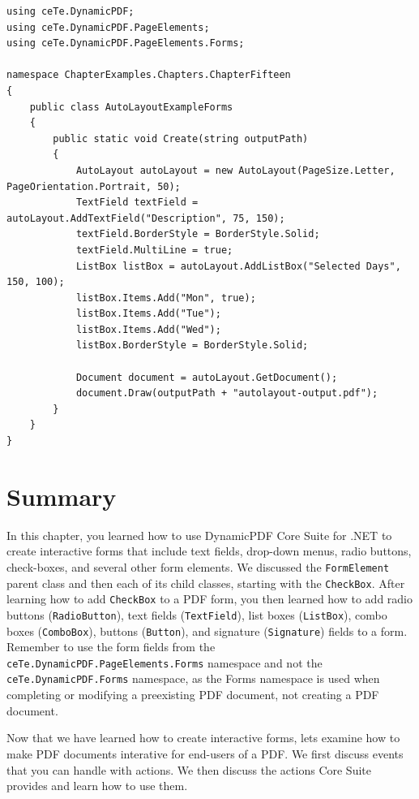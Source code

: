 \documentclass[american,letterpaper]{tufte-book}
\numberwithin{equation}{section}
\numberwithin{figure}{section}
\begin{document}
{\begin{lstlisting}[caption={Using AutoLayout to create a PDF document.},label={lis:autolayout-forms},basicstyle={\small\ttfamily},breaklines=true]
using ceTe.DynamicPDF;
using ceTe.DynamicPDF.PageElements;
using ceTe.DynamicPDF.PageElements.Forms;

namespace ChapterExamples.Chapters.ChapterFifteen
{
    public class AutoLayoutExampleForms
    {
        public static void Create(string outputPath)
        {
            AutoLayout autoLayout = new AutoLayout(PageSize.Letter, PageOrientation.Portrait, 50);
            TextField textField = autoLayout.AddTextField("Description", 75, 150);
            textField.BorderStyle = BorderStyle.Solid;
            textField.MultiLine = true;
            ListBox listBox = autoLayout.AddListBox("Selected Days", 150, 100);
            listBox.Items.Add("Mon", true);
            listBox.Items.Add("Tue");
            listBox.Items.Add("Wed");
            listBox.BorderStyle = BorderStyle.Solid;

            Document document = autoLayout.GetDocument();
            document.Draw(outputPath + "autolayout-output.pdf");
        }
    }
}

\end{lstlisting}
\leavevmode\egroup

\section{Summary}

In this chapter, you learned how to use DynamicPDF Core Suite
for .NET to create interactive forms that include text fields, drop-down
menus, radio buttons, check-boxes, and several other form elements.
We discussed the \texttt{FormElement} parent class and then each of
its child classes, starting with the \texttt{CheckBox}. After learning
how to add \texttt{CheckBox} to a PDF form, you then learned how to
add radio buttons (\texttt{RadioButton}), text fields (\texttt{TextField}),
list boxes (\texttt{ListBox}), combo boxes (\texttt{ComboBox}), buttons
(\texttt{Button}), and signature (\texttt{Signature}) fields to a
form. Remember to use the form fields from the \texttt{ceTe.DynamicPDF.PageElements.Forms}
namespace and not the \texttt{ceTe.DynamicPDF.Forms} namespace, as
the Forms namespace is used when completing or modifying a preexisting
PDF document, not creating a PDF document.

Now that we have learned how to create interactive forms, lets examine
how to make PDF documents interative for end-users of a PDF. We first
discuss events that you can handle with actions. We then discuss the
actions Core Suite provides and learn how to use them. 

}
\end{document}
